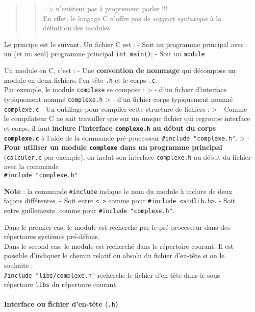 \documentclass[11pt]{article}
\begin{document}
\begin{quote}
\begin{quote}
=\textgreater{} n'existent pas à proprement parler !!!\\
En effet, le langage C n'offre pas de \emph{support syntaxique} à la
définition des modules.
\end{quote}
\end{quote}

Le principe est le suivant. Un fichier C est : - Soit un programme
principal avec un (et un seul) programme principal \texttt{int\ main()};
- Soit un \texttt{module}

Un module en C, c'est : - Une \textbf{convention de nommage} qui
décompose un module en deux fichiers, l'en-tête \texttt{.h} et le corps
\texttt{.c}.\\
Par exemple, le module \texttt{complexe} se compose : \textgreater{} -
d'un fichier d'interface typiquement nommé \texttt{complexe.h}
\textgreater{} - d'un fichier corps typiquement nommé
\texttt{complexe.c} - Un outillage pour compiler cette structure de
fichiers : \textgreater{} - Comme le compilateur C ne sait travailler
que sur un unique fichier qui regroupe interface et corps, il faut
\textbf{inclure l'interface \texttt{complexe.h} au début du corps
\texttt{complexe.c}} à l'aide de la commande pré-processeur
\texttt{\#include\ "complexe.h"}. \textgreater{} - \textbf{Pour utiliser
un module \texttt{complexe} dans un programme principal}
(\texttt{calculer.c} par exemple), on inclut son interface
\texttt{complexe.h} au début du fichier avec la commande\\
\texttt{\#include\ "complexe.h"}

    \textbf{Note} : la commande \texttt{\#include} indique le nom du module
à inclure de deux façons différentes. - Soit entre
\texttt{\textless{}\ \textgreater{}} comme pour
\texttt{\#include\ \textless{}stdlib.h\textgreater{}}. - Soit entre
guillements, comme pour \texttt{\#include\ "complexe.h"}.

Dans le premier cas, le module est recherché par le pré-processeur dans
des répertoires systèmes pré-définis.\\
Dans le second cas, le module est recherché dans le répertoire courant.
Il est possible d'indiquer le chemin relatif ou absolu du fichier
d'en-tête si on le souhaite :\\
\texttt{\#include\ "libs/complexe.h"} recherche le fichier d'en-tête
dans le sous-répertoire \texttt{libs} du répertoire courant.

    \paragraph{\texorpdfstring{Interface ou fichier d'en-tête
(\texttt{.h})}{Interface ou fichier d'en-tête (.h)}}\label{interface-ou-fichier-den-tuxeate-.h}
\end{document}
